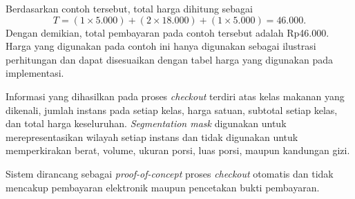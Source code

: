 Berdasarkan contoh tersebut, total harga dihitung sebagai
\[
    T = (1 \times 5.000) + (2 \times 18.000) + (1 \times 5.000) = 46.000.
\]
Dengan demikian, total pembayaran pada contoh tersebut adalah Rp46.000. Harga yang digunakan pada contoh ini hanya digunakan sebagai ilustrasi perhitungan dan dapat disesuaikan dengan tabel harga yang digunakan pada implementasi.

Informasi yang dihasilkan pada proses \textit{checkout} terdiri atas kelas makanan yang dikenali, jumlah instans pada setiap kelas, harga satuan, subtotal setiap kelas, dan total harga keseluruhan. \textit{Segmentation mask} digunakan untuk merepresentasikan wilayah setiap instans dan tidak digunakan untuk memperkirakan berat, volume, ukuran porsi, luas porsi, maupun kandungan gizi.

Sistem dirancang sebagai \textit{proof-of-concept} proses \textit{checkout} otomatis dan tidak mencakup pembayaran elektronik maupun pencetakan bukti pembayaran.
